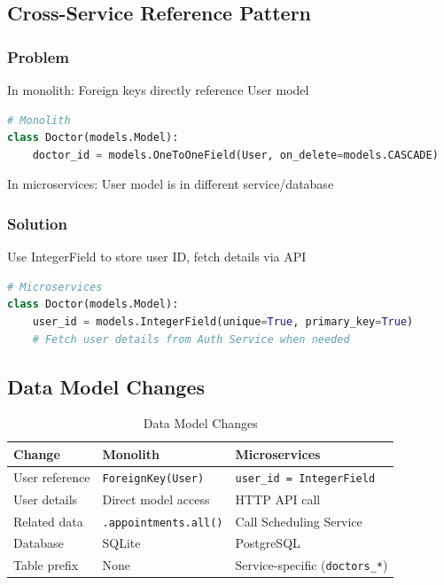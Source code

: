 \documentclass[12pt,a4paper]{article}
\begin{document}
\subsection{Cross-Service Reference Pattern}

\subsubsection{Problem}
In monolith: Foreign keys directly reference User model
\begin{lstlisting}[language=Python]
# Monolith
class Doctor(models.Model):
    doctor_id = models.OneToOneField(User, on_delete=models.CASCADE)
\end{lstlisting}

In microservices: User model is in different service/database

\subsubsection{Solution}
Use IntegerField to store user ID, fetch details via API

\begin{lstlisting}[language=Python]
# Microservices
class Doctor(models.Model):
    user_id = models.IntegerField(unique=True, primary_key=True)
    # Fetch user details from Auth Service when needed
\end{lstlisting}

\subsection{Data Model Changes}

\begin{table}[h]
\centering
\begin{tabular}{@{}lll@{}}
\toprule
\textbf{Change} & \textbf{Monolith} & \textbf{Microservices} \\
\midrule
User reference & \texttt{ForeignKey(User)} & \texttt{user\_id = IntegerField} \\
User details & Direct model access & HTTP API call \\
Related data & \texttt{.appointments.all()} & Call Scheduling Service \\
Database & SQLite & PostgreSQL \\
Table prefix & None & Service-specific (\texttt{doctors\_*}) \\
\bottomrule
\end{tabular}
\caption{Data Model Changes}
\end{table}
\end{document}
